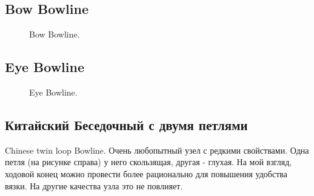 \subsection{Bow Bowline}


\begin{figure}[H]\centering
	\begin{minipage}{1\linewidth}
		\begin{center}
			\tcbox[enhanced jigsaw,colframe=black,opacityframe=0.5,opacityback=0.5]
			{\centering{}}
		\end{center}
	\end{minipage}
\caption{Bow Bowline.}
\label{ris:Bow_Bowline}
\end{figure}

\subsection{Eye Bowline}

\begin{figure}[H]\centering
	\begin{minipage}{1\linewidth}
		\begin{center}
			\tcbox[enhanced jigsaw,colframe=black,opacityframe=0.5,opacityback=0.5]
			{\centering{}}
		\end{center}
	\end{minipage}
\caption{Eye Bowline.}
\label{ris:Eye_Bowline}
\end{figure}

\subsection{Китайский Беседочный с двумя петлями}

Chinese twin loop Bowline. Очень любопытный узел с редкими свойствами. Одна петля (на рисунке справа) у него скользящая, другая - глухая. На мой взгляд, ходовой конец можно провести более рационально для повышения удобства вязки. На другие качества узла это не повлияет.

\begin{figure}[H]\centering
	\subfloat[Завязывание]{\label{ris:Chinese_twin_loop_Bowline_1}
	\tcbox[enhanced jigsaw,colframe=black,opacityframe=0.5,opacityback=0.5,height=7.5cm]
		{\centering
			}
		}
\hfil
	\subfloat[Завязывание]{\label{ris:Chinese_twin_loop_Bowline_2}
	\tcbox[enhanced jigsaw,colframe=black,opacityframe=0.5,opacityback=0.5,height=7.5cm]
		{\centering
			}
		}
\end{figure}

